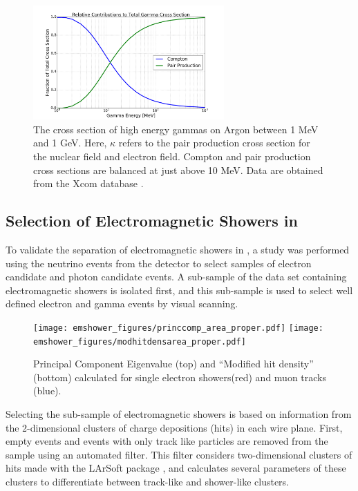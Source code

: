 \begin{figure}[ht!]
  \centering
  \includegraphics[width=0.65\textwidth]{emshower_figures/relative_photonCrossSection.png}
  \caption[Comparison of Compton to Pair Production Cross Section]{\label{fig:relative_gamma_xsec} The cross section of high energy gammas on Argon between 1 MeV and 1 GeV.  Here, $\kappa$ refers to the pair production cross section for the nuclear field and electron field.  Compton and pair production cross sections are balanced at just above 10 MeV.  Data are obtained from the Xcom database \cite{Xcom}.}
\end{figure}


\subsection{Selection of Electromagnetic Showers in \argoneut}

To validate the separation of electromagnetic showers in \lartpcs, a study was performed using the neutrino events from the \argoneut detector to select samples of electron candidate and photon candidate events.  A sub-sample of the \argoneut data set containing electromagnetic showers is isolated first, and this sub-sample is used to select well defined electron and gamma events by visual scanning.


\begin{figure}[htb]
\centering
\texttt{[image: emshower\_figures/princcomp\_area\_proper.pdf]}
\texttt{[image: emshower\_figures/modhitdensarea\_proper.pdf]}
\caption{\label{fig:separation} Principal Component Eigenvalue (top) and ``Modified hit density'' (bottom) calculated for single electron showers(red) and muon tracks (blue).}
\end{figure}

Selecting the sub-sample of electromagnetic showers is based on information from the 2-dimensional clusters of charge depositions (hits) in each wire plane. First, empty events and events with only track like particles are removed from the sample using an automated filter. This filter considers two-dimensional clusters of hits made with the LArSoft package \cite{Church:2013hea}, and calculates several parameters of these clusters to differentiate between track-like and shower-like clusters. 

